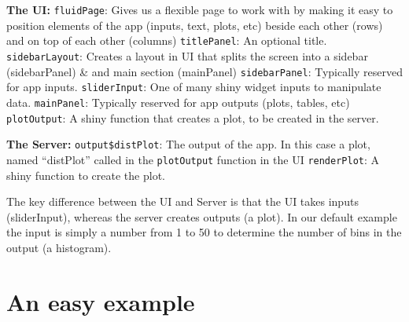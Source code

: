 \documentclass[
]{book}
\begin{document}
\textbf{The UI:}
\texttt{fluidPage}: Gives us a flexible page to work with by making it easy to position elements of the app (inputs, text, plots, etc) beside each other (rows) and on top of each other (columns)
\texttt{titlePanel}: An optional title.
\texttt{sidebarLayout}: Creates a layout in UI that splits the screen into a sidebar (sidebarPanel) \& and main section (mainPanel)
\texttt{sidebarPanel}: Typically reserved for app inputs.
\texttt{sliderInput}: One of many shiny widget inputs to manipulate data.
\texttt{mainPanel}: Typically reserved for app outputs (plots, tables, etc)
\texttt{plotOutput}: A shiny function that creates a plot, to be created in the server.

\textbf{The Server:}
\texttt{output\$distPlot}: The output of the app. In this case a plot, named ``distPlot'' called in the \texttt{plotOutput} function in the UI
\texttt{renderPlot}: A shiny function to create the plot.

The key difference between the UI and Server is that the UI takes inputs (sliderInput), whereas the server creates outputs (a plot). In our default example the input is simply a number from 1 to 50 to determine the number of bins in the output (a histogram).

\hypertarget{an-easy-example}{%
\section*{An easy example}\label{an-easy-example}}
\end{document}
